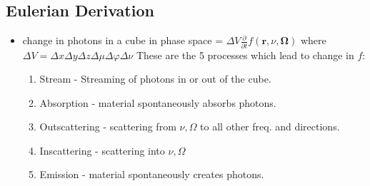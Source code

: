 \documentclass[15pt]{article}
\begin{document}
\subsection{Eulerian Derivation}
\begin{itemize}
    \item change in photons in a cube in phase space = $\Delta V \frac{\partial}{\partial t}
    f(\bm r,\nu,\bm\Omega)$ where $\Delta V=\Delta x \Delta y \Delta z \Delta \mu\Delta\varphi\Delta \nu$
These are the 5 processes which lead to change in $f$:
\begin{enumerate}
    \item Stream - Streaming of photons in or out of the cube.
    \item Absorption - material spontaneously absorbs photons.
    \item Outscattering - scattering from $\nu,\Omega$ to all other freq. and directions.
    \item Inscattering - scattering into $\nu,\Omega$
    \item Emission - material spontaneously creates photons.


\end{enumerate}
\end{itemize}
\end{document}
